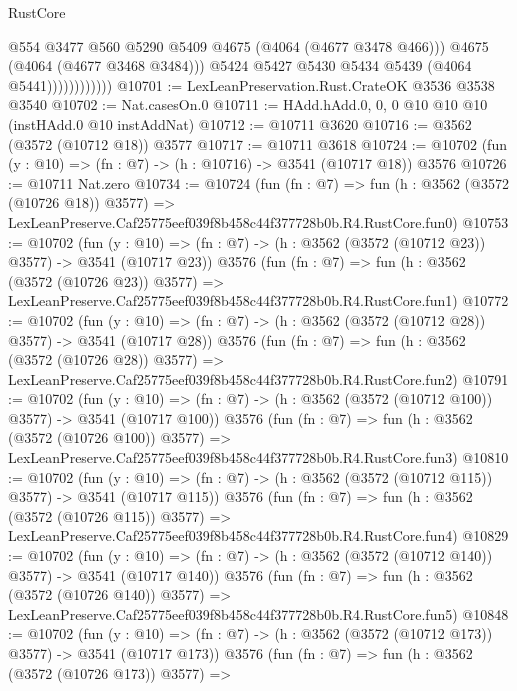 \begin{lexlean}{RustCore}
\begin{coremodule}
                              @554
                              @3477
                              @560
                              @5290
                              @5409
                              @4675
                              (@4064 (@4677 @3478 @466)))
                            @4675
                            (@4064 (@4677 @3468 @3484)))
                          @5424
                          @5427
                          @5430
                          @5434
                          @5439
                          (@4064 @5441))))))))))))
@10701 := LexLeanPreservation.Rust.CrateOK @3536 @3538 @3540
@10702 := Nat.casesOn.{0}
@10711 := HAdd.hAdd.{0, 0, 0} @10 @10 @10 (instHAdd.{0} @10 instAddNat)
@10712 := @10711 @3620
@10716 := @3562 (@3572 (@10712 @18)) @3577
@10717 := @10711 @3618
@10724 := @10702 (fun (y : @10) => (fn : @7) -> (h : @10716) -> @3541 (@10717 @18)) @3576
@10726 := @10711 Nat.zero
@10734 := @10724
    (fun (fn : @7) =>
    fun (h : @3562 (@3572 (@10726 @18)) @3577) =>
    LexLeanPreserve.Caf25775eef039f8b458c44f377728b0b.R4.RustCore.fun0)
@10753 := @10702
    (fun (y : @10) => (fn : @7) -> (h : @3562 (@3572 (@10712 @23)) @3577) -> @3541 (@10717 @23))
    @3576
    (fun (fn : @7) =>
    fun (h : @3562 (@3572 (@10726 @23)) @3577) =>
    LexLeanPreserve.Caf25775eef039f8b458c44f377728b0b.R4.RustCore.fun1)
@10772 := @10702
    (fun (y : @10) => (fn : @7) -> (h : @3562 (@3572 (@10712 @28)) @3577) -> @3541 (@10717 @28))
    @3576
    (fun (fn : @7) =>
    fun (h : @3562 (@3572 (@10726 @28)) @3577) =>
    LexLeanPreserve.Caf25775eef039f8b458c44f377728b0b.R4.RustCore.fun2)
@10791 := @10702
    (fun (y : @10) => (fn : @7) -> (h : @3562 (@3572 (@10712 @100)) @3577) -> @3541 (@10717 @100))
    @3576
    (fun (fn : @7) =>
    fun (h : @3562 (@3572 (@10726 @100)) @3577) =>
    LexLeanPreserve.Caf25775eef039f8b458c44f377728b0b.R4.RustCore.fun3)
@10810 := @10702
    (fun (y : @10) => (fn : @7) -> (h : @3562 (@3572 (@10712 @115)) @3577) -> @3541 (@10717 @115))
    @3576
    (fun (fn : @7) =>
    fun (h : @3562 (@3572 (@10726 @115)) @3577) =>
    LexLeanPreserve.Caf25775eef039f8b458c44f377728b0b.R4.RustCore.fun4)
@10829 := @10702
    (fun (y : @10) => (fn : @7) -> (h : @3562 (@3572 (@10712 @140)) @3577) -> @3541 (@10717 @140))
    @3576
    (fun (fn : @7) =>
    fun (h : @3562 (@3572 (@10726 @140)) @3577) =>
    LexLeanPreserve.Caf25775eef039f8b458c44f377728b0b.R4.RustCore.fun5)
@10848 := @10702
    (fun (y : @10) => (fn : @7) -> (h : @3562 (@3572 (@10712 @173)) @3577) -> @3541 (@10717 @173))
    @3576
    (fun (fn : @7) =>
    fun (h : @3562 (@3572 (@10726 @173)) @3577) =>

\end{coremodule}
\end{lexlean}
